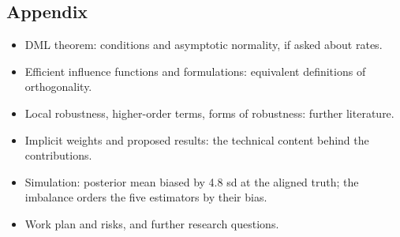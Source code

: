 \documentclass[11pt]{article}
\begin{document}
\subsection*{Appendix}
\begin{itemize}
\item DML theorem: conditions and asymptotic normality, if asked about rates.
\item Efficient influence functions and formulations: equivalent definitions of orthogonality.
\item Local robustness, higher-order terms, forms of robustness: further literature.
\item Implicit weights and proposed results: the technical content behind the contributions.
\item Simulation: posterior mean biased by 4.8 sd at the aligned truth; the imbalance orders the five estimators by their bias.
\item Work plan and risks, and further research questions.
\end{itemize}
\end{document}
